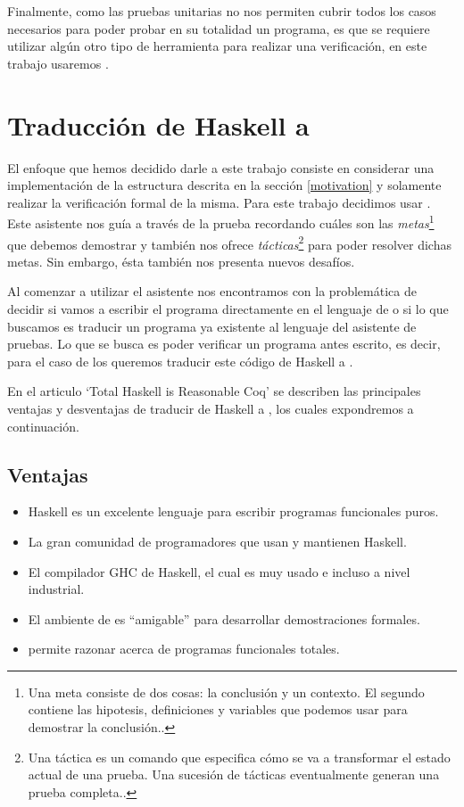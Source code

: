Finalmente, como las pruebas unitarias no nos permiten cubrir todos los casos necesarios para poder probar en su totalidad un programa, es que se requiere utilizar algún otro tipo de herramienta para realizar una verificaci\'on, en este trabajo usaremos {\coq}.



\section{Traducción de Haskell a {\coq}}
El enfoque que hemos decidido darle a este trabajo consiste en considerar una implementaci\'on de 
la estructura descrita en la secci\'on \ref{motivation} y solamente realizar la verificaci\'on formal de la 
misma. Para este trabajo decidimos usar {\coq}. Este asistente nos gu\'ia a través de 
la prueba recordando cu\'ales son las \textit{metas}\footnote{Una meta consiste de dos cosas: la 
conclusi\'on y un contexto. El segundo contiene las hipotesis, definiciones y variables que podemos 
usar para demostrar la conclusi\'on.\cite{GOALS}.} que debemos demostrar y tambi\'en nos ofrece 
\textit{t\'acticas}\footnote{Una táctica es un comando que especifica c\'omo se va a transformar el 
estado actual de una prueba. Una sucesión de tácticas eventualmente generan una prueba 
completa.\cite{TACTICS}.} para poder resolver dichas metas. Sin embargo, \'esta tambi\'en nos presenta 
nuevos desaf\'ios.

Al comenzar a utilizar el asistente nos encontramos con la problem\'atica de decidir si vamos a 
escribir el programa directamente en el lenguaje de {\coq} o si lo que buscamos es traducir un 
programa ya existente al lenguaje del asistente de pruebas. Lo que se busca es poder verificar un 
programa antes escrito, es decir, para el caso de los {\arns} queremos traducir este código de 
Haskell a {\coq}.

En el articulo `Total Haskell is Reasonable Coq' \cite{thrc} se describen las principales ventajas
y desventajas de traducir de Haskell a {\coq}, los cuales expondremos a continuaci\'on.

\subsection{Ventajas}
\begin{itemize}
    \item Haskell es un excelente lenguaje para escribir programas funcionales puros.
    \item La gran comunidad de programadores que usan y mantienen Haskell.
    \item El compilador GHC de Haskell, el cual es muy usado e incluso a nivel industrial.
    \item El ambiente de {\coq} es ``amigable'' para desarrollar demostraciones formales.
    \item {\coq} permite razonar acerca de programas funcionales totales.
\end{itemize}

